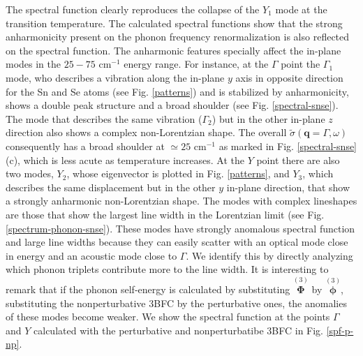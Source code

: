 The spectral function clearly reproduces the collapse of the $Y_{1}$ mode at the transition temperature. The calculated spectral functions show that the strong anharmonicity present on the phonon frequency renormalization is also 
reflected on the spectral function. The anharmonic features specially affect the in-plane modes in the $25-75$ cm$^{-1}$ energy range. For instance, at the $\Gamma$ point the $\Gamma_{1}$ mode, who describes a vibration along 
the in-plane $y$ axis in opposite direction for the Sn and Se atoms (see Fig. \ref{patterns}) and is stabilized by anharmonicity, shows a double peak structure and a broad shoulder (see Fig. \ref{spectral-snse}). The mode that 
describes the same vibration ($\Gamma_{2}$) but in the other in-plane $z$ direction also shows a complex non-Lorentzian shape. The overall $\tilde{\sigma}(\boldsymbol{q}=\Gamma,\omega)$ consequently has a broad shoulder 
at $\simeq25$ cm$^{-1}$ as marked in Fig. \ref{spectral-snse} (c), which is less acute as temperature increases. At the $Y$ point there are also two modes, $Y_{2}$, whose eigenvector is plotted in Fig. \ref{patterns}, and 
$Y_{3}$, which describes the same displacement but in the other $y$ in-plane direction, that show a strongly anharmonic non-Lorentzian shape. The modes with complex lineshapes are those that show the largest line width in the 
Lorentzian limit (see Fig. \ref{spectrum-phonon-snse}). These modes have strongly anomalous spectral function and large line widths because they can easily scatter with an optical mode close in energy and an acoustic mode 
close to $\Gamma$. We identify this by directly analyzing which phonon triplets contribute more to the line width. It is interesting to remark that if the phonon self-energy is calculated by substituting 
$\overset{(3)}{\boldsymbol{\Phi}}$ by $\overset{(3)}{\boldsymbol{\phi}}$, substituting the nonperturbative 3BFC by the perturbative ones, the anomalies of these modes become weaker. We show the spectral function at the points $\Gamma$ 
and $Y$ calculated with the perturbative and nonperturbatibe 3BFC in Fig. \ref{spf-p-np}.
